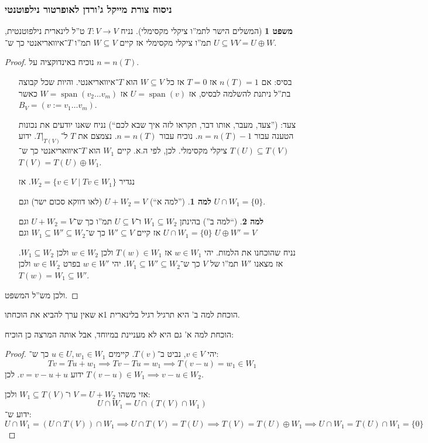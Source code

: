 \documentclass[a4paper]{article}
\DeclareMathOperator{\Sp}      {span}
\newcommand\co        {\colon}
\theoremstyle{definition}
\newtheorem{Theorem}{\color{myblue}משפט}
\newtheorem{Lemma}{\color{myyellow}למה}
\newcommand\lem   [1] {\begin{Lemma}#1\end{Lemma}}
\begin{document}
	\subsubsection{ניסוח צורת מייקל ג'ורדן לאופרטור נילפוטנטי}
	\begin{Theorem}[המשלים הישר לתמ''ו ציקלי מקסימלי]
		נניח $T \co V \to V$ ט''ל לינארית נילפוטנטית, $U \subseteq V$ תמ''ו ציקלי מקסימלי אז קיים $W \subseteq V$ תמ''ו $T$־איוואריאנטי כך ש־$V = U \oplus W$. 
	\end{Theorem}
	\begin{proof}
		נוכיח באינדוקציה על $n = n(T)$. 
		\begin{itemize}
			\item[בסיס: ]אם $n(T) = 1$ אז $T = 0$ אז כל $W \subseteq V$ הוא $T$־איוואריאנטי. והיות שכל קבוצה בת''ל ניתנת להשלמה לבסיס, אז $U = \Sp(v)$ אז $W = \Sp(v_2 \dots v_m)$ כאשר $B_V = (v := v_1 \dots v_m)$. 
			\item[צעד: ](''צעד, מעבר, אותו דבר, תקראו לזה איך שבא לכם``) נניח שאנו יודעים את נכונות הטענה עבור $n = n(T) - 1$. נוכיח עבור $n = n(T)$. נצמצם את $T$ ל־$T|_{{T(V)}}$. ידוע $T(U) \subseteq T(V)$ ציקלי מקסימלי. לכן, לפי ה.א. קיים $W_1$ הוא $T$־איוואריאנטי כך ש־$T(V) = T(U) \oplus W_1$. 
			
			נגדיר $W_2 = \{v \in V \mid Tv \in W_1\}$. אז \lem{(''למה א``) $U + W_2 = V$ (לאו דווקא סכום ישר) וגם $U \cap W_1 = \{0\}$. }
			\lem{(``למה ב'') בהינתן $W_1 \subseteq W_2$ ו־$U \subseteq V$ תמ''ו כך ש־$U + W_2 = V$ וגם $U \cap W_1 = \{0\}$ אז קיים $W' \subseteq V$ כך ש־$W_1 \subseteq W' \subseteq W_2$ וגם $U \oplus W' = V$} 
			
			נניח שהוכחנו את הלמות. יהי $w \in W_1$ אז $T(w) \in W_1$ ולכן $w \in W_2$ ולכן $W_1 \subseteq W_2$.          
			אז מצאנו $W'$ תמ''ו של $V$ כך ש־$W_1 \subseteq W' \subseteq W_2$. יהי $w \in W'$ בפרט $w \in W_2$ ולכן $T(w) = W_1 \subseteq W'$. 
		\end{itemize}
		ולכן מש''ל המשפט. 
	\end{proof}
	
	הוכחת למה ב' היא תרגיל רגיל בלינארית 1א שאין ערך להביא את הוכחתו. 
	
	הוכחת למה א' גם היא לא מעניינת במיוחד, אבל אותה המרצה כן הוכיח: \begin{proof}
		יהי $v \in V$, נביט ב־$T(v)$. קיימים $u \in U, w_1 \in W_1$ כך ש־: 
		\[ Tv = Tu + w_1 \implies Tv - Tu = w_1 \implies T(v - u) = w_1 \in W_1 \]
		ידוע $v = v - u + u$. לכן $T(v - u) \in W_1 \implies v - u \in W_2$. 
		
		אזי משהו $V = U + W_2$ ו־$W_1 \subseteq T(V)$ ולכן: 
		\[ U \cap W_1 = U \cap (T(V) \cap W_1) \]
		ידוע ש־: 
		\[ U \cap W_1 = (U \cap T(V)) \cap W_1 \implies U \cap T(V) = T(U) \implies T(V) = T(U) \oplus W_1 \implies U \cap W_1 = T(U) \cap W_1 = \{0\} \]
	\end{proof}
	
\end{document}
